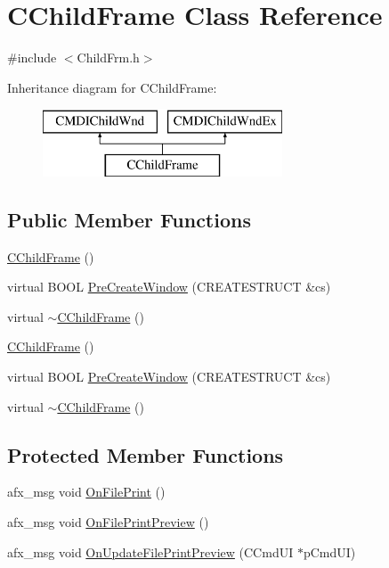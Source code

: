 \hypertarget{class_c_child_frame}{}\section{C\+Child\+Frame Class Reference}
\label{class_c_child_frame}


{\ttfamily \#include $<$Child\+Frm.\+h$>$}

Inheritance diagram for C\+Child\+Frame\+:\begin{figure}[H]
\begin{center}
\leavevmode
\includegraphics[height=2.000000cm]{class_c_child_frame}
\end{center}
\end{figure}
\subsection*{Public Member Functions}
\begin{DoxyCompactItemize}
\item 
\hyperlink{class_c_child_frame_ac25f19634b6795d77ef5b739900232d6}{C\+Child\+Frame} ()
\item 
virtual B\+O\+O\+L \hyperlink{class_c_child_frame_afe5999283ada65f5b1f9fbabb288a8fe}{Pre\+Create\+Window} (C\+R\+E\+A\+T\+E\+S\+T\+R\+U\+C\+T \&cs)
\item 
virtual \hyperlink{class_c_child_frame_ae43d3b449c8696c96963d0818de69735}{$\sim$\+C\+Child\+Frame} ()
\item 
\hyperlink{class_c_child_frame_ac25f19634b6795d77ef5b739900232d6}{C\+Child\+Frame} ()
\item 
virtual B\+O\+O\+L \hyperlink{class_c_child_frame_a260657cfcce56429622305b582eb7da6}{Pre\+Create\+Window} (C\+R\+E\+A\+T\+E\+S\+T\+R\+U\+C\+T \&cs)
\item 
virtual \hyperlink{class_c_child_frame_a5541ade907b001e8d5bbacfa8e4fb21b}{$\sim$\+C\+Child\+Frame} ()
\end{DoxyCompactItemize}
\subsection*{Protected Member Functions}
\begin{DoxyCompactItemize}
\item 
afx\+\_\+msg void \hyperlink{class_c_child_frame_a1e013fd34eef65f6075b01daea5f9aac}{On\+File\+Print} ()
\item 
afx\+\_\+msg void \hyperlink{class_c_child_frame_adc9e355521d8d070364d17f381b1a0cd}{On\+File\+Print\+Preview} ()
\item 
afx\+\_\+msg void \hyperlink{class_c_child_frame_aec72edc029b23ad2134c729b90dac554}{On\+Update\+File\+Print\+Preview} (C\+Cmd\+U\+I $\ast$p\+Cmd\+U\+I)
\end{DoxyCompactItemize}


